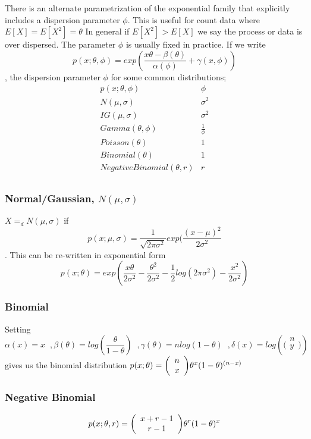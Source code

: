 There is an alternate parametrization of the exponential family
that explicitly includes a dispersion parameter $\phi$.  This
is useful for count data where $E[X]=E[X^2]=\theta$  In general
if $E[X^2]>E[X]$ we say the process  or data is over dispersed.
The parameter $\phi$ is usually fixed in practice.  If we write
\[ p(x; \theta, \phi)=exp(\frac{x \theta-
\beta(\theta)}{\alpha(\phi)}+\gamma(x,\phi))\], the dispersion
parameter $\phi$ for some common distributions;
\[
\begin{array}{cc}
p(x;\theta, \phi) & \phi \\ \hline
N(\mu,\sigma) & \sigma^2 \\
IG(\mu,\sigma) & \sigma^2 \\
Gamma(\theta,\phi) & \frac{1}{\phi} \\
Poisson(\theta) & 1 \\
Binomial(\theta) & 1 \\
Negative Binomial(\theta,r) & r \\
\end{array}
\]

\subsubsection{Normal/Gaussian, $N(\mu,\sigma)$}
$X=_d N(\mu,\sigma)$ if \[p(x; \mu, \sigma) = \frac{1}{\sqrt{2
\pi \sigma^2}} exp ( \frac{(x-\mu)^2}{2 \sigma^2}\].  This can
be re-written in exponential form \[ p(x;\theta) = exp( \frac{x
\theta}{2 \sigma^2} - \frac{\theta^2}{2 \sigma^2 }-
\frac{1}{2}log(2 \pi \sigma^2) - \frac{x^2}{2 \sigma^2 } ) \]

\subsubsection{Binomial}
Setting \[\alpha(x)=x \;\;,
\beta(\theta)=log(\frac{\theta}{1-\theta}) \;\;,
\gamma(\theta)=n log(1-\theta) \;\;, \delta(x)=log ( \biggl(
\begin{array}{c}  n \\  y \\ \end{array}  \biggr) )
\] gives us the binomial distribution $p(x;\theta) = \biggl( \begin{array}{c} n \\ x \\ \end{array} \biggr) \theta^x
(1-\theta)^{(n-x)}$

\subsubsection{Negative Binomial}
\[p(x;\theta,r)=\biggl( \begin{array}{c} x+r-1 \\ r-1 \\ \end{array} \biggr) \theta^r (1-\theta)^x\]

